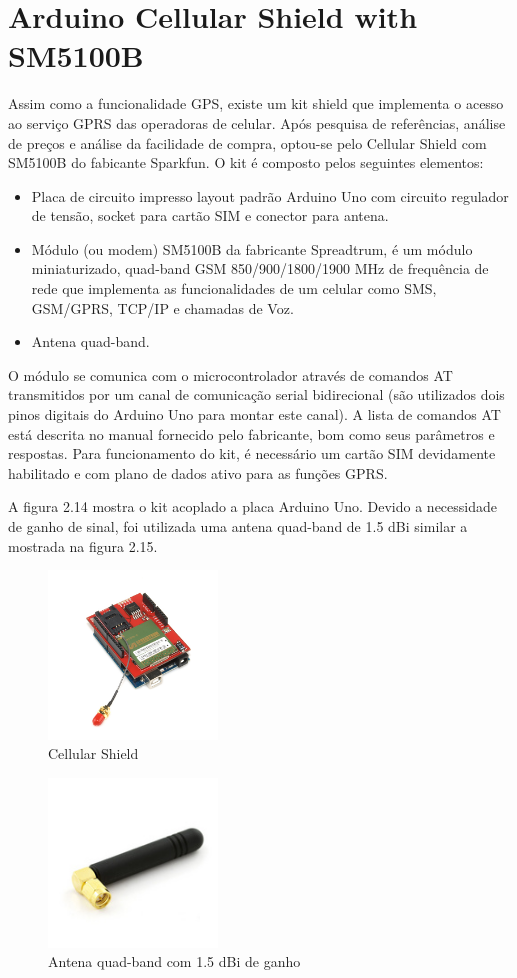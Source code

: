 \section {Arduino Cellular Shield with SM5100B}

Assim como a funcionalidade GPS, existe um kit shield que implementa o acesso ao serviço GPRS das operadoras de celular. Após pesquisa de referências, análise de preços e análise da facilidade de compra, optou-se pelo Cellular Shield com SM5100B do fabicante Sparkfun. O kit é composto pelos seguintes elementos:

\begin{itemize}
	\item Placa de circuito impresso layout padrão Arduino Uno com circuito regulador de tensão, socket para cartão SIM e conector para antena.
	\item Módulo (ou modem) SM5100B da fabricante Spreadtrum, é um módulo miniaturizado, quad-band GSM 850/900/1800/1900 MHz de frequência de rede que implementa as funcionalidades de um celular como SMS, GSM/GPRS, TCP/IP e chamadas de Voz.
	\item Antena quad-band.
\end{itemize}

O módulo se comunica com o microcontrolador através de comandos AT transmitidos por um canal de comunicação serial bidirecional (são utilizados dois pinos digitais do Arduino Uno para montar este canal). A lista de comandos AT está descrita no manual fornecido pelo fabricante, bom como seus parâmetros e respostas. Para funcionamento do kit, é necessário um cartão SIM devidamente habilitado e com plano de dados ativo para as funções GPRS.

 A figura 2.14 mostra o kit acoplado a placa Arduino Uno. Devido a necessidade de ganho de sinal, foi utilizada uma antena quad-band de 1.5 dBi similar a mostrada na figura 2.15.

\begin{figure}[h!]
			\centering
			\includegraphics[width=0.4\textwidth]{figures/gsm.jpg}
			\caption{Cellular Shield}
			\label{1}
\end{figure}

\begin{figure}[h!]
			\centering
			\includegraphics[width=0.4\textwidth]{figures/antena.jpg}
			\caption{Antena quad-band com 1.5 dBi de ganho}
			\label{1}
\end{figure}